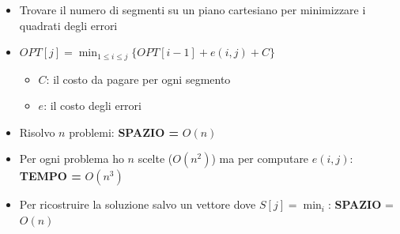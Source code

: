 \begin{itemize}
  \item Trovare il numero di segmenti su un piano cartesiano per minimizzare i
        quadrati degli errori
  \item $OPT[j] = \min_{1 \le i \le j} \{ OPT[i-1] + e(i,j) + C \}$

        \begin{itemize}
          \item $C$: il costo da pagare per ogni segmento
          \item $e$: il costo degli errori
        \end{itemize}
  \item Risolvo $n$ problemi: \textbf{SPAZIO =} $O(n)$
  \item Per ogni problema ho $n$ scelte ($O(n^2)$) ma per computare
        $e(i,j)$: \textbf{TEMPO =} $O(n^3)$
  \item Per ricostruire la soluzione salvo un vettore dove $S[j] = \min_i$:
        \textbf{SPAZIO} = $O(n)$
\end{itemize}

